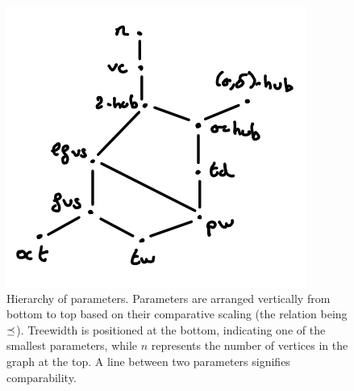 \begin{figure}
    \centering
    \includegraphics[width=.4\textwidth]{figures/hierarchy.png}
    \caption{Hierarchy of parameters. Parameters are arranged vertically from bottom to top based on their comparative scaling (the relation being $\preceq$). Treewidth is positioned at the bottom, indicating one of the smallest parameters, while $n$ represents the number of vertices in the graph at the top. A line between two parameters signifies comparability.}
    \label{fig:hierarchy}
\end{figure}